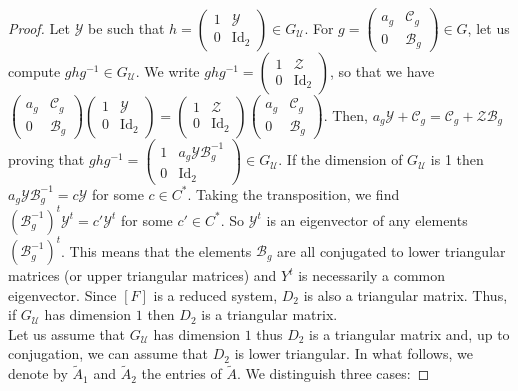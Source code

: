\documentclass[a4paper,11pt]{amsart}
\newcommand{\Gunip}{G_{\mathcal{U}}}
\begin{document}
\begin{proof}
Let $\mathscr{Y}$ be such that $h= \begin{pmatrix}
1&\mathscr{Y} \\ 
0 & \mathrm{Id}_2 
\end{pmatrix} \in \Gunip$.  
For $g=\begin{pmatrix}
a_g & \mathscr{C}_g \\ 
0 & \mathscr{B}_g  
\end{pmatrix} \in G$, let us compute $ghg^{-1}\in \Gunip$.  We write 
$ghg^{-1}= \begin{pmatrix}
1&\mathscr{Z}\\ 
0 & \mathrm{Id}_2 
\end{pmatrix} $,  so that we have $\begin{pmatrix}
a_g & \mathscr{C}_g \\ 
0 & \mathscr{B}_g  
\end{pmatrix}\begin{pmatrix}
1& \mathscr{Y} \\ 
0 & \mathrm{Id}_2 
\end{pmatrix} =\begin{pmatrix}
1&\mathscr{Z} \\ 
0 & \mathrm{Id}_2 
\end{pmatrix} \begin{pmatrix}
a_g & \mathscr{C}_g \\ 
0 & \mathscr{B}_g  
\end{pmatrix}$. 
Then,  $a_g \mathscr{Y} + \mathscr{C}_g = \mathscr{C}_g + \mathscr{Z}\mathscr{B}_g$ proving that
$ghg^{-1}= \begin{pmatrix}
1&a_g \mathscr{Y} \mathscr{B}_g^{-1} \\ 
0 & \mathrm{Id}_2 
\end{pmatrix}  \in \Gunip$.
If the dimension of $\Gunip$ is 1 then  $a_g \mathscr{Y} \mathscr{B}_{g}^{-1}=c\mathscr{Y}$ for some $c\in C^*$. Taking the transposition,  we find $(\mathscr{B}_g^{-1})^{t}\mathscr{Y}^{t}=c'\mathscr{Y}^t$ for some $c'\in C^*$. 
So $\mathscr{Y}^{t}$ is an eigenvector of any elements $(\mathscr{B}_g^{-1})^{t}$.  This means that the elements $\mathscr{B}_g$ are all conjugated to lower triangular matrices (or upper triangular matrices) and $Y^{t}$ is necessarily a common eigenvector. Since $[F]$ is a reduced system, $D_2$ is also a triangular matrix. Thus, if $\Gunip$ has dimension $1$ then $D_2$ is a triangular matrix.\\

Let us  assume that $\Gunip$ has dimension $1$ thus  $D_2$ is a triangular matrix and, up to conjugation, we can assume that $D_2$ is lower triangular. In what follows, we denote by $\widetilde{A}_1$ and $\widetilde{A}_2$ the entries of $\widetilde{A}$. We distinguish three cases:


\end{proof}
\end{document}
